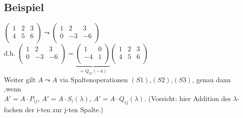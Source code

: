 \documentclass[a4paper,twoside]{article}
\begin{document}
\subsection*{Beispiel}
$\left(\begin{matrix} 
1 & 2 & 3 \\
4 & 5 & 6 \\
\end{matrix} \right) \leadsto
\left(\begin{matrix}
1 & 2 & 3 \\
0 & -3 & -6 \\
\end{matrix} \right) $\\
d.h. $
\left(\begin{matrix}
1 & 2 & 3 \\
0 & -3 & -6 \\
\end{matrix} \right) = 
\underbrace{\left(\begin{matrix}
1 & 0  \\
-4 & 1 \\
\end{matrix} \right)}_{=Q_{21}(-4)}
\left(\begin{matrix}
1 & 2 & 3 \\
4 & 5 & 6 \\
\end{matrix} \right)$\\
Weiter gilt $A \leadsto A$ via Spaltenoperationen $(S1)$,$(S2)$,$(S3)$, genau dann ,wenn\\
$A' = A \cdot P_{ij}$, $A' = A \cdot S_i(\lambda)$, $A' = A \cdot Q_{ij}(\lambda)$. (Vorsicht: hier Addition des $\lambda$-fachen der i-ten zur j-ten Spalte.) 
\end{document}

